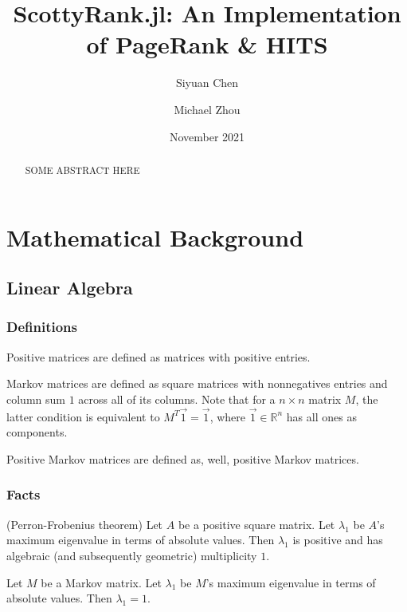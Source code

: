 \documentclass[12pt, titlepage, twoside]{amsart}
\newcommand{\R}{\ensuremath{\mathbb R}}
\begin{document}
\title[ScottyRank.jl]{ScottyRank.jl: An Implementation of PageRank \& HITS}

\author{Siyuan Chen}
\author{Michael Zhou}
\date{November 2021}

\begin{abstract}
  SOME ABSTRACT HERE
\end{abstract}

\maketitle

\tableofcontents

\section{Mathematical Background}

\subsection{Linear Algebra}

\subsubsection{Definitions}

Positive matrices are defined as matrices with positive entries.

Markov matrices are defined as square matrices with nonnegatives entries and column sum $1$ across all of its columns.
Note that for a $n\times n$ matrix $M$, the latter condition is equivalent to $M^T\vec{1} = \vec{1}$,
where $\vec{1}\in\R^n$ has all ones as components.

Positive Markov matrices are defined as, well, positive Markov matrices.

\subsubsection{Facts}

(Perron-Frobenius theorem)
Let $A$ be a positive square matrix.
Let $\lambda_1$ be $A$'s maximum eigenvalue in terms of absolute values.
Then $\lambda_1$ is positive and has algebraic (and subsequently geometric) multiplicity $1$.

Let $M$ be a Markov matrix.
Let $\lambda_1$ be $M$'s maximum eigenvalue in terms of absolute values.
Then $\lambda_1 = 1$.
\end{document}
